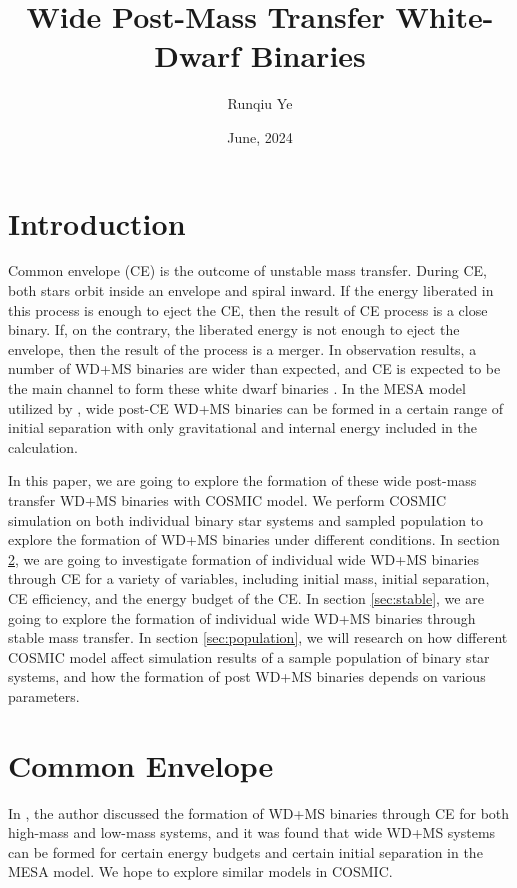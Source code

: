 \documentclass[12pt]{article}
\title{Wide Post-Mass Transfer White-Dwarf Binaries}
\author{Runqiu Ye}
\date{June, 2024}
\begin{document}
\maketitle

\section{Introduction} \label{sec:intro}

Common envelope (CE) is the outcome of unstable mass transfer. During CE, both stars orbit inside an envelope and spiral inward. If the energy liberated in this process is enough to eject the CE, then the result of CE process is a close binary. If, on the contrary, the liberated energy is not enough to eject the envelope, then the result of the process is a merger. In observation results, a number of WD+MS binaries are wider than expected, and CE is expected to be the main channel to form these white dwarf binaries \cite{yamaguchi_hi, yamaguchi_lo}. In the MESA model utilized by \cite{yamaguchi_hi, yamaguchi_lo}, wide post-CE WD+MS binaries can be formed in a certain range of initial separation with only gravitational and internal energy included in the calculation. 

In this paper, we are going to explore the formation of these wide post-mass transfer WD+MS binaries with COSMIC model. We perform COSMIC simulation on both individual binary star systems and sampled population to explore the formation of WD+MS binaries under different conditions. In section \ref{sec:ce}, we are going to investigate formation of individual wide WD+MS binaries through CE for a variety of variables, including initial mass, initial separation, CE efficiency, and the energy budget of the CE. In section \ref{sec:stable}, we are going to explore the formation of individual wide WD+MS binaries through stable mass transfer. In section \ref{sec:population}, we will research on how different COSMIC model affect simulation results of a sample population of binary star systems, and how the formation of post WD+MS binaries depends on various parameters.

\section{Common Envelope} \label{sec:ce}
In \cite{yamaguchi_hi, yamaguchi_lo}, the author discussed the formation of WD+MS binaries through CE for both high-mass and low-mass systems, and it was found that wide WD+MS systems can be formed for certain energy budgets and certain initial separation in the MESA model. We hope to explore similar models in COSMIC.
\end{document}

